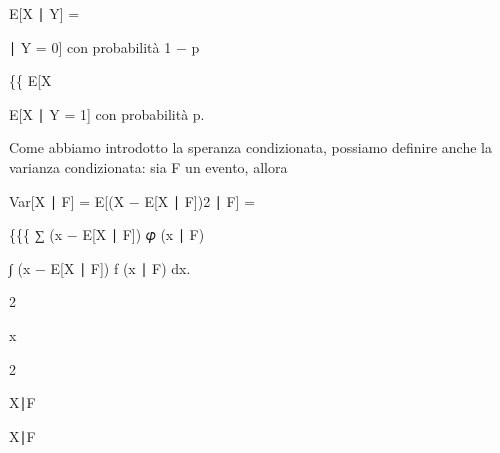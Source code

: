 \documentclass[a4paper,portrait,12pt]{article}
\begin{document}
\begin{flushleft}
E[X ∣ Y] =
\end{flushleft}





\begin{flushleft}
∣ Y = 0] con probabilit\`{a} 1 $-$ p
\end{flushleft}


\begin{flushleft}
\{\{ E[X
\end{flushleft}


\begin{flushleft}
E[X ∣ Y = 1] con probabilit\`{a} p.
\end{flushleft}





\begin{flushleft}
Come abbiamo introdotto la speranza condizionata, possiamo definire anche la varianza condizionata: sia F un evento, allora
\end{flushleft}


\begin{flushleft}
Var[X ∣ F] = E[(X $-$ E[X ∣ F])2 ∣ F] =
\end{flushleft}





\begin{flushleft}
\{\{\{ ∑ (x $-$ E[X ∣ F]) 𝜑 (x ∣ F)
\end{flushleft}


\begin{flushleft}
∫ (x $-$ E[X ∣ F]) f (x ∣ F) dx.
\end{flushleft}


2





\begin{flushleft}
x
\end{flushleft}





2





\begin{flushleft}
X∣F
\end{flushleft}





\begin{flushleft}
X∣F
\end{flushleft}
\end{document}
